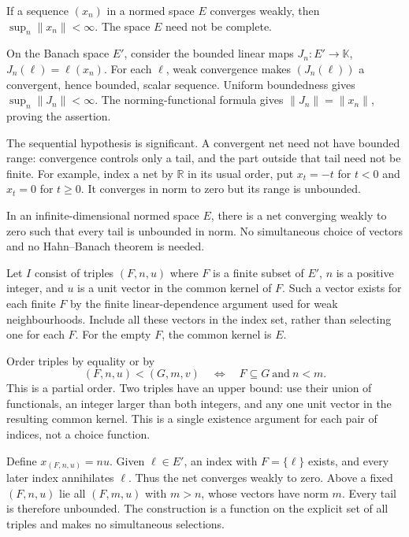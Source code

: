 \begin{corollary}
If a sequence $(x_n)$ in a normed space $E$ converges weakly, then
$\sup_n\|x_n\|<\infty$. The space $E$ need not be complete.
\end{corollary}
\Proof
On the Banach space $E'$, consider the bounded linear maps
$J_n:E'\to\mathbb K$, $J_n(\ell)=\ell(x_n)$.
For each $\ell$, weak convergence makes $(J_n(\ell))$ a convergent,
hence bounded, scalar sequence. Uniform boundedness gives
$\sup_n\|J_n\|<\infty$. The norming-functional formula gives
$\|J_n\|=\|x_n\|$, proving the assertion.
\Done

The sequential hypothesis is significant. A convergent net need not
have bounded range: convergence controls only a tail, and the part
outside that tail need not be finite. For example, index a net by
$\mathbb R$ in its usual order, put $x_t=-t$ for $t<0$ and $x_t=0$
for $t\geq0$. It converges in norm to zero but its range is unbounded.

\begin{proposition}
\label{prop:weak_net_unbounded_tails}
In an infinite-dimensional normed space $E$, there is a net converging
weakly to zero such that every tail is unbounded in norm. No simultaneous
choice of vectors and no Hahn--Banach theorem is needed.
\end{proposition}
\Proof
Let $I$ consist of triples $(F,n,u)$ where $F$ is a finite subset of
$E'$, $n$ is a positive integer, and $u$ is a unit vector in the common
kernel of $F$. Such a vector exists for each finite $F$ by the finite
linear-dependence argument used for weak neighbourhoods. Include all
these vectors in the index set, rather than selecting one for each $F$.
For the empty $F$, the common kernel is $E$.

Order triples by equality or by
\[
(F,n,u)<(G,m,v)\quad\Longleftrightarrow\quad F\subseteq G\ \text{and}\ n<m.
\]
This is a partial order. Two triples have an upper bound: use their
union of functionals, an integer larger than both integers, and any
one unit vector in the resulting common kernel. This is a single
existence argument for each pair of indices, not a choice function.

Define $x_{(F,n,u)}=nu$. Given $\ell\in E'$, an index with
$F=\{\ell\}$ exists, and every later index annihilates $\ell$.
Thus the net converges weakly to zero. Above a fixed $(F,n,u)$ lie
all $(F,m,u)$ with $m>n$, whose vectors have norm $m$. Every tail
is therefore unbounded. The construction is a function on the explicit
set of all triples and makes no simultaneous selections.
\Done

